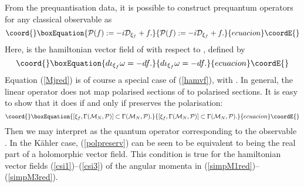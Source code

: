 \documentclass[a4paper,11pt]{article}
\begin{document}
From the prequantisation data, it is possible to 
construct prequantum operators \coordHE{} for any classical observable 
\coordHE{} as
\begin{equation}\coord{}\boxEquation{\label{preqP}
{\cal P}(f):=-i{\cal D}_{\xi_{f}}+f.
}{{\cal P}(f):=-i{\cal D}_{\xi_{f}}+f.
}{ecuacion}\coordE{}\end{equation}
Here, \coordHE{} is the hamiltonian vector field of \coordHE{} with respect 
to \myHighlight{$\omega$}\coordHE{}, defined by 
\begin{equation}\coord{}\boxEquation{\label{hamvf}
d\iota_{\xi_{f}}\omega=-df.
}{d\iota_{\xi_{f}}\omega=-df.
}{ecuacion}\coordE{}\end{equation}
Equation (\ref{Mjred}) is of course a special case of (\ref{hamvf}),
with \coordHE{}.
In general, the linear operator \coordHE{} does not map polarised
sections of \coordHE{} to polarised sections. It is easy to show that it does
if and only if \coordHE{} preserves the polarisation:
\begin{equation}\coord{}\boxEquation{\label{polpreserv}
[\xi_{f},\Gamma({\cal M}_{N},{\cal P})]\subset\Gamma({\cal M}_{N},{\cal P}).
}{[\xi_{f},\Gamma({\cal M}_{N},{\cal P})]\subset\Gamma({\cal M}_{N},{\cal P}).
}{ecuacion}\coordE{}\end{equation}
Then we may interpret \coordHE{} as the quantum operator
corresponding to the observable \coordHE{}.
In the K\"ahler case, (\ref{polpreserv}) can be seen to be 
equivalent to \coordHE{} being the real part of a holomorphic vector field.
This condition is true for the hamiltonian vector fields 
(\ref{csi1})--(\ref{csi3}) of the
angular momenta in (\ref{simpM1red})--(\ref{simpM3red}).
\end{document}
